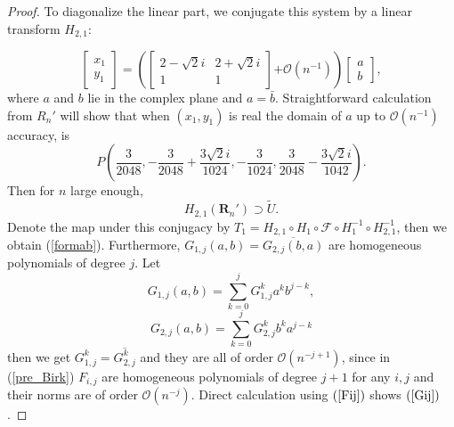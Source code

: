 \documentclass{article}
\numberwithin{figure}{section}
\numberwithin{equation}{section}
\theoremstyle{remark}
\theoremstyle{definition}
\begin{document}
\begin{proof}
To diagonalize the linear part, we conjugate this
system by a linear transform $H_{2,1}$:

\begin{equation}\label{Elp}
\begin{bmatrix}
x_{1} \\
y_{1}
\end{bmatrix} = \left( \begin{bmatrix}
2-\sqrt{2}i& 2 + \sqrt{2}i \\
1 & 1
\end{bmatrix}\mathcal{+ O}\left( n^{- 1} \right) \right)\begin{bmatrix}
a \\
b
\end{bmatrix},
\end{equation}
where $a$ and $b$ lie in the complex plane and $a=\bar{b}$. Straightforward calculation from $R_n'$ will show that when $(x_1,y_1)$ is real the domain of $a$ up to $\mathcal{O}(n^{-1})$ accuracy, is 
$$P\left(	\frac{3}{2048},  -\frac{3}{2048}+\frac{3\sqrt{2}i}{1024}, -\frac{3}{1024},  \frac{3}{2048}-\frac{3\sqrt{2}i}{1042}\right).$$
Then for $n$ large enough,  $$H_{2,1}\left(\mathbf{R}_n'\right)\supset \widetilde{U}.$$ 
Denote the map under this conjugacy by $T_1=H_{2,1}\circ H_1\circ \mathcal{F}\circ H_1^{-1}\circ H_{2,1}^{-1}$, then we obtain (\ref{formab}). Furthermore,
\(G_{1,j}(a,b) = \overline{G_{2,j}(b,a)}\) are homogeneous polynomials of degree $j$.
Let
$$G_{1,j}(a,b) = \sum_{k = 0}^{j }{G_{1,j}^{k}a^{k}b^{j - k}},$$
$$G_{2,j}(a,b) = \sum_{k = 0}^{j }{G_{2,j}^{k}b^{k}a^{j  - k}}$$
then we get \(G_{1,j}^{k} = \overline{G_{2,j}^{k}}\) and they are all of order \(\mathcal{O}\left( n^{- j+1} \right)\), since in (\ref{pre_Birk}) $F_{i,j}$ are homogeneous polynomials of degree $j+1$ for any $i,j$ and their norms are of order $\mathcal{O}(n^{-j})$. Direct calculation using $(\ref{Fij})$ shows $(\ref{Gij})$. 
\end{proof}
\end{document}
